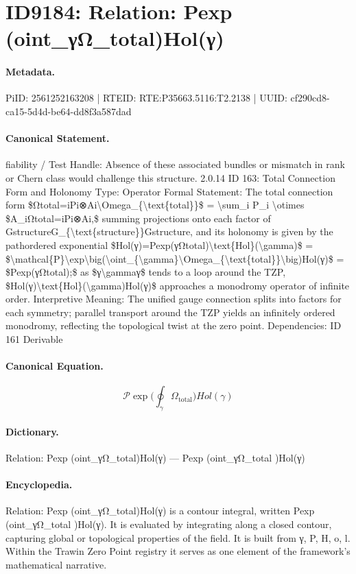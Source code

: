 \section*{ID9184: Relation: Pexp (oint\_γΩ\_total)Hol(γ)}
\paragraph{Metadata.}
PiID: 2561252163208 | RTEID: RTE:P35663.5116:T2.2138 | UUID: cf290cd8-ca15-5d4d-be64-dd8f3a587dad

\paragraph{Canonical Statement.}
fiability / Test Handle: Absence of these associated bundles or mismatch in rank or Chern class would challenge this structure. 2.0.14 ID 163: Total Connection Form and Holonomy Type: Operator Formal Statement: The total connection form \$Ωtotal=iPi⊗Ai\textbackslash{}Omega\_\{\textbackslash{}text\{total\}\}\$ = \textbackslash{}sum\_i P\_i \textbackslash{}otimes \$A\_iΩtotal=iPi⊗Ai,\$ summing projections onto each factor of GstructureG\_\{\textbackslash{}text\{structure\}\}Gstructure, and its holonomy is given by the pathordered exponential \$Hol(γ)=Pexp(γΩtotal)\textbackslash{}text\{Hol\}(\textbackslash{}gamma)\$ = \$\textbackslash{}mathcal\{P\}\textbackslash{}exp\textbackslash{}big(\textbackslash{}oint\_\{\textbackslash{}gamma\}\textbackslash{}Omega\_\{\textbackslash{}text\{total\}\}\textbackslash{}big)Hol(γ)\$ = \$Pexp(γΩtotal);\$ as \$γ\textbackslash{}gammaγ\$ tends to a loop around the TZP, \$Hol(γ)\textbackslash{}text\{Hol\}(\textbackslash{}gamma)Hol(γ)\$ approaches a monodromy operator of infinite order. Interpretive Meaning: The unified gauge connection splits into factors for each symmetry; parallel transport around the TZP yields an infinitely ordered monodromy, reflecting the topological twist at the zero point. Dependencies: ID 161 Derivable

\paragraph{Canonical Equation.}
\[
\mathcal{P}\exp\big(\oint_{\gamma}\Omega_{\text{total}}\big)Hol(γ)
\]

\paragraph{Dictionary.}
Relation: Pexp (oint\_γΩ\_total)Hol(γ) — Pexp (oint\_γΩ\_total )Hol(γ)

\paragraph{Encyclopedia.}
Relation: Pexp (oint\_γΩ\_total)Hol(γ) is a contour integral, written Pexp (oint\_γΩ\_total )Hol(γ). It is evaluated by integrating along a closed contour, capturing global or topological properties of the field. It is built from γ, P, H, o, l. Within the Trawin Zero Point registry it serves as one element of the framework's mathematical narrative.
